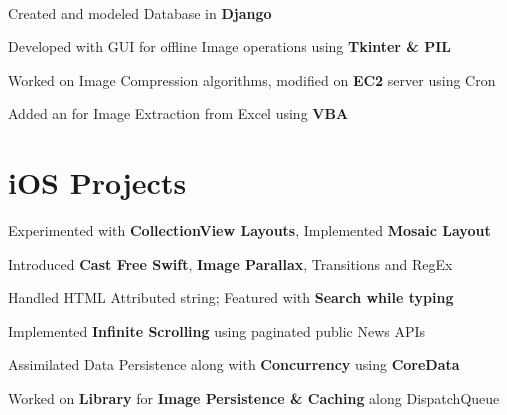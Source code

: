 \documentclass[]{Kauts}
\begin{document}
\begin{minipage}[t]{0.69\textwidth}
\\
\begin{tightemize}
\item Created  and modeled Database in \textbf{Django}\\
\item Developed  with GUI for offline Image operations using \textbf{Tkinter \& PIL}\\
\item Worked on Image Compression algorithms, modified on \textbf{EC2} server using Cron\\
\item Added an  for Image Extraction from Excel using \textbf{VBA}
\end{tightemize}


\section{iOS Projects }
\begin{tightemize}
\item Experimented with \textbf{CollectionView Layouts}, Implemented \textbf{Mosaic Layout}\\
\item Introduced \textbf{Cast Free Swift}, \textbf{Image Parallax}, Transitions and RegEx\\
\item Handled HTML Attributed string; Featured with \textbf{Search while typing}\\
\end{tightemize}
\sectionsep

\begin{tightemize}
\item Implemented \textbf{Infinite Scrolling} using paginated public News APIs\\
\item Assimilated Data Persistence along with \textbf{Concurrency} using \textbf{CoreData}\\
\item Worked on \textbf{Library} for \textbf{Image Persistence \& Caching} along DispatchQueue\\
\end{tightemize}
\sectionsep


\end{minipage}
\end{document}
